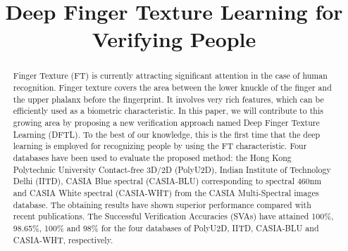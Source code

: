 \documentclass[conference]{IEEEtran}
\begin{document}
\title{Deep Finger Texture Learning for Verifying People\\
}

\author{
\and
{}
\and
{}
}

\maketitle

\begin{abstract}
Finger Texture (FT) is currently attracting significant attention in the case of human recognition. Finger texture covers the area between the lower knuckle of the finger and the upper phalanx before the fingerprint. It involves very rich features, which can be efficiently used as a biometric characteristic. In this paper, we will contribute to this growing area by proposing a new verification approach named Deep Finger Texture Learning (DFTL). To the best of our knowledge, this is the first time that the deep learning is employed for recognizing people by using the FT characteristic. Four databases have been used to evaluate the proposed method: the Hong Kong Polytechnic University Contact-free 3D/2D (PolyU2D), Indian Institute of Technology Delhi (IITD), CASIA Blue spectral (CASIA-BLU) corresponding to spectral 460nm and CASIA White spectral (CASIA-WHT) from the CASIA Multi-Spectral images database. The obtaining results have shown superior performance compared with recent publications. The Successful Verification Accuracies (SVAs) have attained 100\%, 98.65\%, 100\% and 98\% for the four databases of PolyU2D, IITD, CASIA-BLU and CASIA-WHT, respectively. 
\end{abstract}
\end{document}
